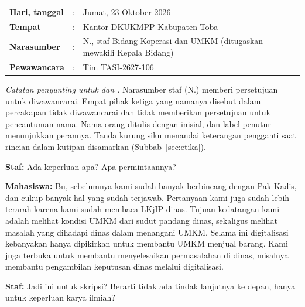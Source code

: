 \clearpage
{}
{}

{\small
\begin{tabular}{@{}l@{\ }l@{\ }p{}@{}}
\textbf{Hari, tanggal} & : & Jumat, 23 Oktober 2026 \\
\textbf{Tempat} & : & Kantor DKUKMPP Kabupaten Toba \\
\textbf{Narasumber} & : & N., staf Bidang Koperasi dan UMKM (ditugaskan mewakili Kepala Bidang) \\
\textbf{Pewawancara} & : & Tim TASI-2627-106 \\
\end{tabular}

\vspace{1.2em}

\noindent\textit{Catatan penyunting untuk \lampstaf{} dan \lampkadis.}
Narasumber staf (N.) memberi persetujuan untuk diwawancarai. Empat pihak ketiga yang namanya disebut dalam percakapan tidak diwawancarai dan tidak memberikan persetujuan untuk pencantuman nama. Nama orang ditulis dengan inisial, dan label penutur menunjukkan perannya. Tanda kurung siku menandai keterangan pengganti saat rincian dalam kutipan disamarkan (Subbab~\ref{sec:etika}).

\noindent \textbf{Staf:} Ada keperluan apa? Apa permintaannya?

\noindent \textbf{Mahasiswa:} Bu, sebelumnya kami sudah banyak berbincang dengan Pak Kadis, dan cukup banyak hal yang sudah terjawab. Pertanyaan kami juga sudah lebih terarah karena kami sudah membaca LKjIP dinas. Tujuan kedatangan kami adalah melihat kondisi UMKM dari sudut pandang dinas, sekaligus melihat masalah yang dihadapi dinas dalam menangani UMKM. Selama ini digitalisasi kebanyakan hanya dipikirkan untuk membantu UMKM menjual barang. Kami juga terbuka untuk membantu menyelesaikan permasalahan di dinas, misalnya membantu pengambilan keputusan dinas melalui digitalisasi.

\noindent \textbf{Staf:} Jadi ini untuk skripsi? Berarti tidak ada tindak lanjutnya ke depan, hanya untuk keperluan karya ilmiah?

}

